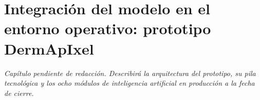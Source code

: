 
\chapter{Integración del modelo en el entorno operativo: prototipo DermApIxel}
\label{cap:dermapixel}

\textit{Capítulo pendiente de redacción. Describirá la arquitectura del
prototipo, su pila tecnológica y los ocho módulos de inteligencia
artificial en producción a la fecha de cierre.}
